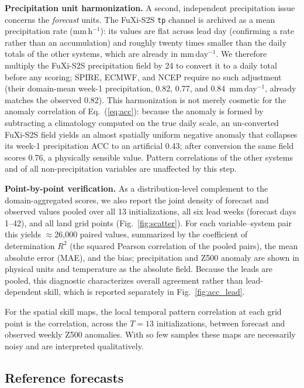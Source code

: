 \documentclass[11pt,a4paper]{article}
\begin{document}
\textbf{Precipitation unit harmonization.} A second, independent
precipitation issue concerns the \emph{forecast} units. The FuXi-S2S
\texttt{tp} channel is archived as a mean precipitation rate
(mm\,h$^{-1}$): its values are flat across lead day (confirming a rate
rather than an accumulation) and roughly twenty times smaller than the
daily totals of the other systems, which are already in mm\,day$^{-1}$.
We therefore multiply the FuXi-S2S precipitation field by 24 to convert
it to a daily total before any scoring; SPIRE, ECMWF, and NCEP require no
such adjustment (their domain-mean week-1 precipitation, 0.82, 0.77, and
0.84~mm\,day$^{-1}$, already matches the observed 0.82). This
harmonization is not merely cosmetic for the anomaly correlation of
Eq.~(\ref{eq:acc}): because the anomaly is formed by subtracting a
climatology computed on the true daily scale, an un-converted FuXi-S2S
field yields an almost spatially uniform negative anomaly that collapses
its week-1 precipitation ACC to an artificial 0.43; after conversion the
same field scores 0.76, a physically sensible value. Pattern
correlations of the other systems and of all non-precipitation variables
are unaffected by this step.

\textbf{Point-by-point verification.} As a distribution-level complement
to the domain-aggregated scores, we also report the joint density of
forecast and observed values pooled over all 13 initializations, all six
lead weeks (forecast days 1--42), and all land grid points
(Fig.~\ref{fig:scatter}). For each variable--system pair this yields
$\approx$26{,}000 paired values, summarized by the coefficient of
determination $R^{2}$ (the squared Pearson correlation of the pooled
pairs), the mean absolute error (MAE), and the bias; precipitation and
Z500 anomaly are shown in physical units and temperature as the absolute
field. Because the leads are pooled, this diagnostic characterizes
overall agreement rather than lead-dependent skill, which is reported
separately in Fig.~\ref{fig:acc_lead}.

For the spatial skill maps, the local temporal pattern correlation at
each grid point is the correlation, across the $T=13$ initializations,
between forecast and observed weekly Z500 anomalies. With so few samples
these maps are necessarily noisy and are interpreted qualitatively.

\subsection{Reference forecasts}\label{sec:baselines}
\end{document}
